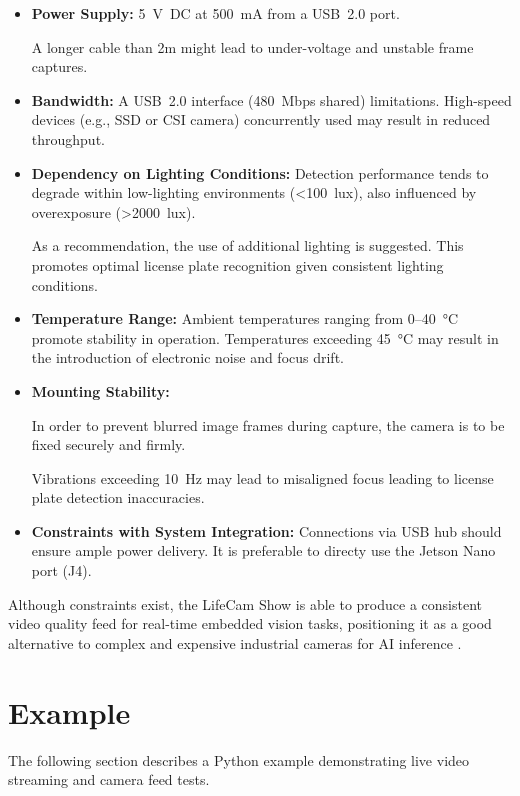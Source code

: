 \begin{itemize}
	\item \textbf{Power Supply:} 5~V~DC at 500~mA from a \ac{USB}~2.0 port.  
	
	A longer cable than 2m might lead to under-voltage and unstable frame captures. 
	
	\item \textbf{Bandwidth:} A \ac{USB}~2.0 interface (480~Mbps shared) limitations.  
	High-speed devices (e.g., SSD or CSI camera) concurrently used may result in reduced throughput.
	
	\item \textbf{Dependency on Lighting Conditions:}  
	Detection performance tends to degrade within low-lighting environments (<100~lux), also influenced by overexposure (>2000~lux).  
	
	As a recommendation, the use of additional lighting is suggested. This promotes optimal license plate recognition given consistent lighting conditions.
	
	\item \textbf{Temperature Range:}  
	Ambient temperatures ranging from 0–40~°C promote stability in operation.  
	Temperatures exceeding 45~°C may result in the introduction of electronic noise and focus drift.
	
	\item \textbf{Mounting Stability:}  
	
	In order to prevent blurred image frames during capture, the camera is to be fixed securely and firmly. 
	
	Vibrations exceeding 10~Hz may lead to misaligned focus leading to license plate detection inaccuracies.
	
	\item \textbf{Constraints with System Integration:}  
	Connections via \ac{USB} hub should ensure ample power delivery. It is preferable to directy use the Jetson Nano port (J4).
\end{itemize}

Although constraints exist, the LifeCam Show is able to produce a consistent video quality feed for real-time embedded vision tasks, positioning it as a good alternative to complex and expensive industrial cameras for AI inference \cite{edgeAIbook,techradar_lifecam_review}.

\section{Example}
The following section describes a Python example demonstrating live video streaming and camera feed tests.

